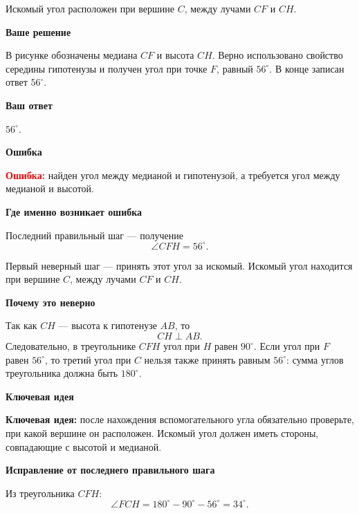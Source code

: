 \documentclass[12pt,a4paper]{article}
\newcommand{\errorlabel}{\textcolor{red}{\textbf{Ошибка:}}}
\newcommand{\keyidea}{\textcolor{blue!60!black}{\textbf{Ключевая идея:}}}
\newcommand{\subhead}[1]{\par\medskip\textbf{#1}\par}
\begin{document}
\begin{center}

\small Искомый угол расположен при вершине $C$, между лучами $CF$ и $CH$.
\end{center}

\subhead{Ваше решение}
В рисунке обозначены медиана $CF$ и высота $CH$. Верно использовано свойство середины гипотенузы и получен угол при точке $F$, равный $56^\circ$. В конце записан ответ $56^\circ$.

\subhead{Ваш ответ}
$56^\circ$.

\subhead{Ошибка}
\errorlabel{} найден угол между медианой и гипотенузой, а требуется угол между медианой и высотой.

\subhead{Где именно возникает ошибка}
Последний правильный шаг --- получение
\[
\angle CFH=56^\circ.
\]

Первый неверный шаг --- принять этот угол за искомый. Искомый угол находится при вершине $C$, между лучами $CF$ и $CH$.

\subhead{Почему это неверно}
Так как $CH$ --- высота к гипотенузе $AB$, то
\[
CH\perp AB.
\]
Следовательно, в треугольнике $CFH$ угол при $H$ равен $90^\circ$. Если угол при $F$ равен $56^\circ$, то третий угол при $C$ нельзя также принять равным $56^\circ$: сумма углов треугольника должна быть $180^\circ$.

\subhead{Ключевая идея}
\keyidea{} после нахождения вспомогательного угла обязательно проверьте, при какой вершине он расположен. Искомый угол должен иметь стороны, совпадающие с высотой и медианой.

\subhead{Исправление от последнего правильного шага}
Из треугольника $CFH$:
\[
\angle FCH=180^\circ-90^\circ-56^\circ=34^\circ.
\]
\end{document}
